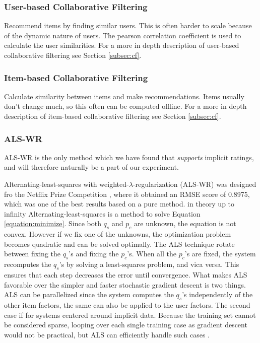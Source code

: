 \subsubsection{User-based Collaborative Filtering}

Recommend items by finding similar users. This is often harder to scale because of the dynamic nature of users. The pearson correlation coefficient is used to calculate the user similarities. For a more in depth description of user-based collaborative filtering see Section \ref{subsec:cf}.

\subsubsection{Item-based Collaborative Filtering}

Calculate similarity between items and make recommendations. Items usually don't change much, so this often can be computed offline. For a more in depth description of item-based collaborative filtering see Section \ref{subsec:cf}.%

\subsubsection{ALS-WR}


ALS-WR is the only method which we have found that \emph{supports} implicit ratings, and will therefore naturally be a part of our experiment.

Alternating-least-squares with weighted-$\lambda$-regularization (ALS-WR) was designed fro the Netflix Prize Competition \cite{Netflix}, where it obtained an RMSE score of 0.8975, which was one of the best results based on a pure method.
in theory up to infinity
Alternating-least-squares is a method to solve Equation \ref{equation:minimize}. Since both $q_{s}$ and $p_{c}$ are unknown, the equation is not convex. However if we fix one of the unknowns, the optimization problem becomes quadratic and can be solved optimally. The ALS technique rotate between fixing the $q_{s}$'s and fixing the $p_{c}$'s. When all the $p_{c}$'s are fixed, the system recomputes the $q_{s}$'s by solving a least-squares problem, and vica versa. This ensures that each step decreases the error until convergence. What makes ALS favorable over the simpler and faster stochastic gradient descent is two things. ALS can be parallelized since the system computes the $q_{s}$'s independently of the other item factors, the same can also be applied to the user factors. The second case if for systems centered around implicit data. Because the training set cannot be considered sparse, looping over each single training case as gradient descent would not be practical, but ALS can efficiently handle such cases \cite{Hu2008}.\newline

